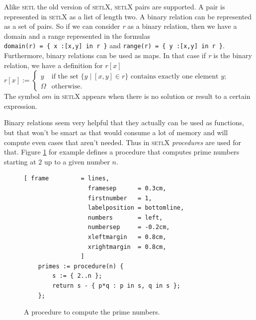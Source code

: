 \documentclass[11pt]{report}
\begin{document}
Alike \textsc{setl} the old version of \textsc{setlX}, \textsc{setlX} pairs are supported. A pair is represented in \textsc{setlX} as a list of length two. A binary relation can be represented as a set of pairs. So if we can consider \textsl{r} as a binary relation, then we have a domain and a range represented in the formulas 
\\[0.2cm]
\hspace*{1.3cm}
\texttt{domain(r) = \{ x :[x,y] in r \}} \quad and \quad
\texttt{range(r)  = \{ y :[x,y] in r \}}.
\\[0.2cm]
Furthermore, binary relations can be used as maps. In that case if \textsl{r} is the binary relation, we have a definition for $r[x]$
\\[0.2cm]
\hspace*{1.3cm}
$r[x] := \left\{
\begin{array}{ll}
  y & \mbox{if the set $\{ y \mid [x,y] \in r\}$ contains exactly one element $y$;} \\[0.2cm]
  \Omega & \mbox{otherwise}.
\end{array} \right.
$
\\[0.2cm]
The symbol $om$ in \textsc{setlX} appears when there is no solution or result to a certain expression.

Binary relations seem very helpful that they actually can be used as functions, but that won't be smart as that would consume a lot of memory and will compute even cases that aren't needed. Thus in \textsc{setlX} \textsl{procedures} are used for that. Figure \ref{fig:primes.stlx} for example defines a procedure that computes prime numbers starting at $2$ up to a given number $n$.
\begin{figure}[!ht]
\centering
\begin{Verbatim}[ frame         = lines, 
                  framesep      = 0.3cm, 
                  firstnumber   = 1,
                  labelposition = bottomline,
                  numbers       = left,
                  numbersep     = -0.2cm,
                  xleftmargin   = 0.8cm,
                  xrightmargin  = 0.8cm,
                ]
    primes := procedure(n) { 
        s := { 2..n }; 
        return s - { p*q : p in s, q in s }; 
    };
\end{Verbatim}
\vspace*{-0.3cm}
\caption{A procedure to compute the prime numbers.}
\label{fig:primes.stlx}
\end{figure}
\end{document}
